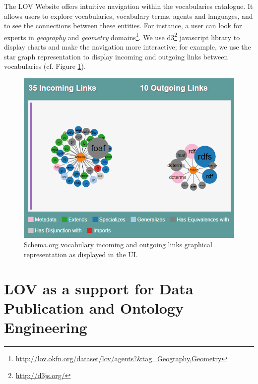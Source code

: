 \documentclass{iosart2c}
\begin{document}
The LOV Website offers intuitive navigation within the vocabularies catalogue. It allows users to explore vocabularies, vocabulary terms, agents and languages, and to see the connections between these entities. For instance, a user can look for experts in \emph{geography} and \emph{geometry} domains\footnote{\url{http://lov.okfn.org/dataset/lov/agents?&tag=Geography,Geometry}}. We use d3\footnote{\url{http://d3js.org/}} javascript library to display charts and make the navigation more interactive; for example, we use the star graph representation to display incoming and outgoing links between vocabularies (cf. Figure \ref{fig:graphVocab}). 


\begin{figure}[ht!b]
\includegraphics[scale=0.45]{graphVocab.png}
\caption{Schema.org vocabulary incoming and outgoing links graphical representation as displayed in the UI.}
\label{fig:graphVocab}
\end{figure}




\section{LOV as a support for Data Publication and Ontology Engineering}
\label{sec:dataPubOntoEngine}
\end{document}
